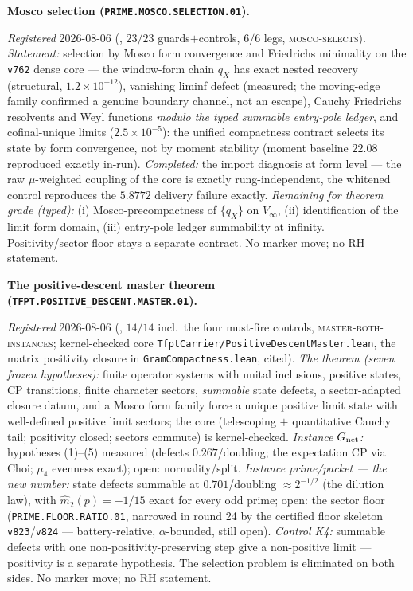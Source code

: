 \documentclass[11pt,a4paper]{article}
\begin{document}
\par\smallskip\noindent\textbf{Mosco selection
(\texttt{PRIME.MOSCO.SELECTION.01}).}
{\sloppy
\emph{Registered} 2026-08-06
(, $23/23$
guards$+$controls, $6/6$ legs, \textsc{mosco-selects}).
\emph{Statement:} selection by Mosco form convergence and
Friedrichs minimality on the \texttt{v762} dense core --- the
window-form chain $q_X$ has exact nested recovery (structural,
$1.2\times10^{-12}$), vanishing liminf defect (measured; the
moving-edge family confirmed a genuine boundary channel, not an
escape), Cauchy Friedrichs resolvents and Weyl functions
\emph{modulo the typed summable entry-pole ledger}, and
cofinal-unique limits ($2.5\times10^{-5}$): the unified
compactness contract selects its state by form convergence, not
by moment stability (moment baseline $22.08$ reproduced exactly
in-run).  \emph{Completed:} the import diagnosis at form level
--- the raw $\mu$-weighted coupling of the core is exactly
rung-independent, the whitened control reproduces the $5.8772$
delivery failure exactly.  \emph{Remaining for theorem grade
(typed):} (i) Mosco-precompactness of $\{q_X\}$ on $V_\infty$,
(ii) identification of the limit form domain, (iii) entry-pole
ledger summability at infinity.  Positivity/sector floor stays a
separate contract.  No marker move; no RH statement.\par}

\par\smallskip\noindent\textbf{The positive-descent master theorem
(\texttt{TFPT.POSITIVE\_DESCENT.MASTER.01}).}
{\sloppy
\emph{Registered} 2026-08-06
(, $14/14$ incl.\ the
four must-fire controls, \textsc{master-both-instances};
kernel-checked core \texttt{TfptCarrier/PositiveDescentMaster.lean},
the matrix positivity closure in \texttt{GramCompactness.lean},
cited).  \emph{The theorem (seven frozen hypotheses):} finite
operator systems with unital inclusions, positive states, CP
transitions, finite character sectors, \emph{summable} state
defects, a sector-adapted closure datum, and a Mosco form family
force a unique positive limit state with well-defined positive
limit sectors; the core (telescoping $+$ quantitative Cauchy
tail; positivity closed; sectors commute) is kernel-checked.
\emph{Instance $G_{\rm net}$:} hypotheses (1)--(5) measured
(defects $0.267$/doubling; the expectation CP via Choi; $\mu_4$
evenness exact); open: normality/split.  \emph{Instance
prime/packet --- the new number:} state defects summable at
$0.701$/doubling $\approx2^{-1/2}$ (the dilution law), with
$\hat m_2(p)=-1/15$ exact for every odd prime; open: the sector
floor (\texttt{PRIME.FLOOR.RATIO.01}, narrowed in round 24 by the
certified floor skeleton \texttt{v823}/\texttt{v824} ---
battery-relative, $\alpha$-bounded, still open).  \emph{Control K4:}
summable defects with one non-positivity-preserving step give a
non-positive limit --- positivity is a separate hypothesis.  The
selection problem is eliminated on both sides.  No marker move;
no RH statement.\par}
\end{document}
